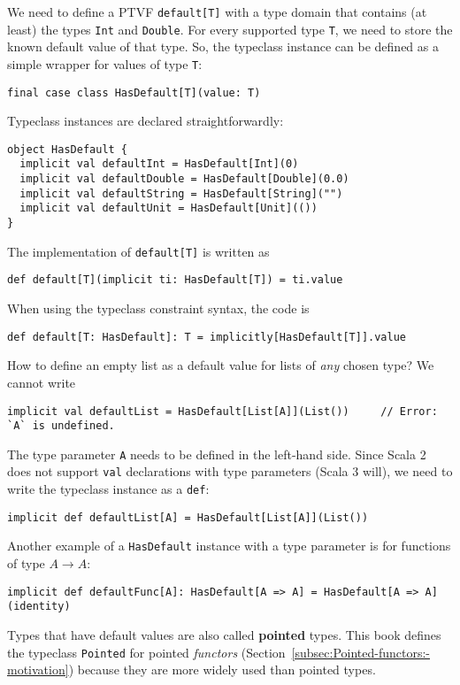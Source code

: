 We need to define a PTVF \lstinline!default[T]! with a type domain
that contains (at least) the types \lstinline!Int! and \lstinline!Double!.
For every supported type \lstinline!T!, we need to store the known
default value of that type. So, the typeclass instance can be defined
as a simple wrapper for values of type \lstinline!T!:
\begin{lstlisting}
final case class HasDefault[T](value: T)
\end{lstlisting}
Typeclass instances are declared straightforwardly:
\begin{lstlisting}
object HasDefault {
  implicit val defaultInt = HasDefault[Int](0)
  implicit val defaultDouble = HasDefault[Double](0.0)
  implicit val defaultString = HasDefault[String]("")
  implicit val defaultUnit = HasDefault[Unit](())
}
\end{lstlisting}
The implementation of \lstinline!default[T]! is written as
\begin{lstlisting}
def default[T](implicit ti: HasDefault[T]) = ti.value
\end{lstlisting}
When using the typeclass constraint syntax, the code is
\begin{lstlisting}
def default[T: HasDefault]: T = implicitly[HasDefault[T]].value
\end{lstlisting}

How to define an empty list as a default value for lists of \emph{any}
chosen type? We cannot write
\begin{lstlisting}
implicit val defaultList = HasDefault[List[A]](List())     // Error: `A` is undefined.
\end{lstlisting}
The type parameter \lstinline!A! needs to be defined in the left-hand
side. Since Scala 2 does not support \lstinline!val! declarations
with type parameters (Scala 3 will), we need to write the typeclass
instance as a \lstinline!def!:
\begin{lstlisting}
implicit def defaultList[A] = HasDefault[List[A]](List())
\end{lstlisting}

Another example of a \lstinline!HasDefault! instance with a type
parameter is for functions of type $A\rightarrow A$:
\begin{lstlisting}
implicit def defaultFunc[A]: HasDefault[A => A] = HasDefault[A => A](identity)
\end{lstlisting}

Types that have default values are also called \textbf{pointed}
types. This book defines the typeclass \lstinline!Pointed! for pointed
\emph{functors} (Section~\ref{subsec:Pointed-functors:-motivation})
because they are more widely used than pointed types.

